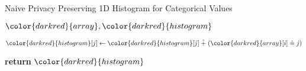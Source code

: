 \begin{algorithm}[H]
\caption{Naive Privacy Preserving 1D Histogram for Categorical Values}\label{a:1d-simple-histogram-categorical}
\begin{algorithmic}[1]
\renewcommand{\algorithmicrequire}{\textbf{Private Vars:}}
\Require ${\color{darkred}{array}}, {\color{darkred}{histogram}}$




            \State ${\color{darkred}{histogram}}[j] \gets {\color{darkred}{histogram}}[j] \hplus ({\color{darkred}{array}}[i] \heq j)$

        \EndFor{}
    \EndFor
    \State \textbf{return} {${\color{darkred}{histogram}}$}
\EndProcedure
\end{algorithmic}
\end{algorithm}
